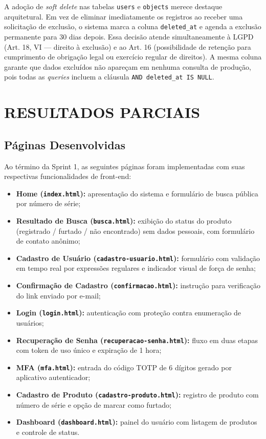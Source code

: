 \documentclass[12pt,a4paper]{article}
\begin{document}
A adoção de \textit{soft delete} nas tabelas \texttt{users} e \texttt{objects}
merece destaque arquitetural. Em vez de eliminar imediatamente os registros ao
receber uma solicitação de exclusão, o sistema marca a coluna \texttt{deleted\_at}
e agenda a exclusão permanente para 30 dias depois. Essa decisão atende
simultaneamente à LGPD (Art. 18, VI — direito à exclusão) e ao Art. 16
(possibilidade de retenção para cumprimento de obrigação legal ou exercício regular
de direitos). A mesma coluna garante que dados excluídos não apareçam em nenhuma
consulta de produção, pois todas as \textit{queries} incluem a cláusula
\texttt{AND deleted\_at IS NULL}.

\section{RESULTADOS PARCIAIS}

\subsection{Páginas Desenvolvidas}

Ao término da Sprint 1, as seguintes páginas foram implementadas com suas respectivas funcionalidades de front-end:

\begin{itemize}
  \item \textbf{Home (\texttt{index.html}):} apresentação do sistema e formulário de busca pública por número de série;
  \item \textbf{Resultado de Busca (\texttt{busca.html}):} exibição do status do produto (registrado / furtado / não encontrado) sem dados pessoais, com formulário de contato anônimo;
  \item \textbf{Cadastro de Usuário (\texttt{cadastro-usuario.html}):} formulário com validação em tempo real por expressões regulares e indicador visual de força de senha;
  \item \textbf{Confirmação de Cadastro (\texttt{confirmacao.html}):} instrução para verificação do link enviado por e-mail;
  \item \textbf{Login (\texttt{login.html}):} autenticação com proteção contra enumeração de usuários;
  \item \textbf{Recuperação de Senha (\texttt{recuperacao-senha.html}):} fluxo em duas etapas com token de uso único e expiração de 1 hora;
  \item \textbf{MFA (\texttt{mfa.html}):} entrada do código TOTP de 6 dígitos gerado por aplicativo autenticador;
  \item \textbf{Cadastro de Produto (\texttt{cadastro-produto.html}):} registro de produto com número de série e opção de marcar como furtado;
  \item \textbf{Dashboard (\texttt{dashboard.html}):} painel do usuário com listagem de produtos e controle de status.
\end{itemize}
\end{document}
